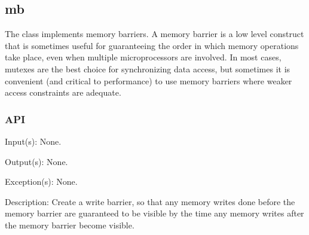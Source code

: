 %
%
%
%
%              

\subsection{mb}
\label{mb}

The  class implements memory barriers.  A memory barrier is a low
level construct that is sometimes useful for guaranteeing the order in which
memory operations take place, even when multiple microprocessors are involved.
In most cases, mutexes are the best choice for synchronizing data access, but
sometimes it is convenient (and critical to performance) to use memory barriers
where weaker access constraints are adequate.

\subsubsection{API}
\begin{capi}
\label{mb_write}
	\begin{capilist}
	\item[Input(s): ] None.
	\item[Output(s): ] None.
	\item[Exception(s): ] None.
	\item[Description: ]
		Create a write barrier, so that any memory writes done before
		the memory barrier are guaranteed to be visible by the time any
		memory writes after the memory barrier become visible.
	\end{capilist}
\end{capi}
